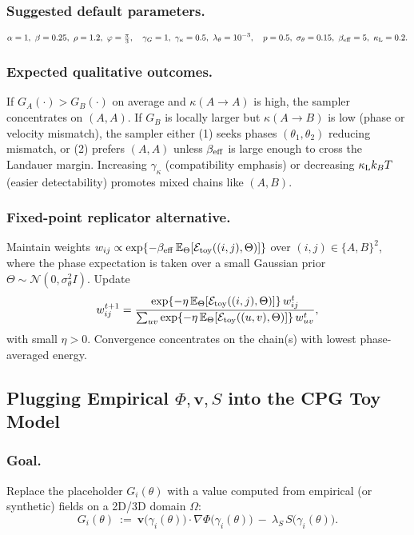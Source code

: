 \documentclass[a4paper,11pt]{article}
\begin{document}
\subsubsection{Suggested default parameters.}
\begin{equation}
\alpha=1,\ \beta=0.25,\ \rho=1.2,\ \varphi=\tfrac{\pi}{3},\quad
\gamma_G=1,\ \gamma_\kappa=0.5,\ \lambda_\theta=10^{-3},\quad
p=0.5,\ \sigma_\theta=0.15,\ \beta_{\rm eff}=5,\ \kappa_{\rm L}=0.2.
\end{equation}

\subsubsection{Expected qualitative outcomes.}
If $G_A(\cdot)\!>\!G_B(\cdot)$ on average and $\kappa(A\!\to\!A)$ is high, the sampler concentrates on $(A,A)$.
If $G_B$ is locally larger but $\kappa(A\!\to\!B)$ is low (phase or velocity mismatch), the sampler either
(1) seeks phases $(\theta_1,\theta_2)$ reducing mismatch, or (2) prefers $(A,A)$ unless $\beta_{\rm eff}$ is large enough to cross the Landauer margin. Increasing $\gamma_\kappa$ (compatibility emphasis) or decreasing $\kappa_{\rm L}k_B T$ (easier detectability) promotes mixed chains like $(A,B)$.

\subsubsection{Fixed-point replicator alternative.}
Maintain weights $w_{ij}\propto \exp\{-\beta_{\rm eff}\,\mathbb{E}_{\Theta}[\mathcal{E}_{\rm toy}((i,j),\Theta)]\}$ over $(i,j)\in\{A,B\}^2$, where the phase expectation is taken over a small Gaussian prior $\Theta\sim \mathcal{N}(0,\sigma_\theta^2 I)$. Update
\begin{equation}
w_{ij}^{t+1}=\frac{\exp\{-\eta\,\mathbb{E}_{\Theta}[\mathcal{E}_{\rm toy}((i,j),\Theta)]\}\,w_{ij}^{t}}{\sum_{uv}\exp\{-\eta\,\mathbb{E}_{\Theta}[\mathcal{E}_{\rm toy}((u,v),\Theta)]\}\,w_{uv}^{t}},
\end{equation}
with small $\eta>0$. Convergence concentrates on the chain(s) with lowest phase-averaged energy.

\subsection{Plugging Empirical $\Phi,\mathbf v,S$ into the CPG Toy Model}
\label{sec:empirical-fields}

\subsubsection{Goal.} Replace the placeholder $G_i(\theta)$ with a value computed from
empirical (or synthetic) fields on a 2D/3D domain $\Omega$:
\begin{equation}
G_i(\theta)\ :=\ \mathbf v\big(\gamma_i(\theta)\big)\cdot \nabla \Phi\big(\gamma_i(\theta)\big)\ -\ \lambda_S\,S\big(\gamma_i(\theta)\big).
\end{equation}
\end{document}
